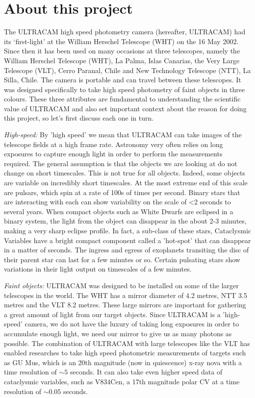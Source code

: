 \section{About this project} 

The ULTRACAM high speed photometry camera (hereafter, ULTRACAM) had its `first-light' at the William Herschel Telescope (WHT) on the 16 May 2002. Since then it has been used on many occasions at three telescopes, namely the William Herschel Telescope (WHT), La Palma, Islas Canarias, the Very Large Telescope (VLT), Cerro Paranal, Chile and New Technology Telescope (NTT), La Silla, Chile. The camera is portable and can travel between these telescopes. It was designed specifically to take high speed photometry of faint objects in three colours. These three attributes are fundamental to understanding the scientific value of ULTRACAM and also set important context about the reason for doing this project, so let's first discuss each one in turn. 

\emph{High-speed:} By 'high speed' we mean that ULTRACAM can take images of the telescope fields at a high frame rate. Astronomy very often relies on long exposures to capture enough light in order to perform the measurements required. The general assumption is that the objects we are looking at do not change on short timescales. This is not true for all objects. Indeed, some objects are variable on incredibly short timescales. At the most extreme end of this scale are pulsars, which spin at a rate of 100s of times per second. Binary stars that are interacting with each can show variability on the scale of \textless 2 seconds to several years. When compact objects such as White Dwarfs are eclipsed in a binary system, the light from the object can disappear in the about 2-3 minutes, making a very sharp eclipse profile. In fact, a sub-class of these stars, Cataclysmic Variables have a bright compact component called a 'hot-spot' that can disappear in a matter of seconds. The ingress and egress of exoplanets transiting the disc of their parent star can last for a few minutes or so. Certain pulsating stars show variations in their light output on timescales of a few minutes. 

\emph{Faint objects:} ULTRACAM was designed to be installed on some of the larger telescopes in the world. The WHT has a mirror diameter of 4.2 metres, NTT 3.5 metres and the VLT 8.2 metres. These large mirrors are important for gathering a great amount of light from our target objects. Since ULTRACAM is a 'high-speed' camera, we do not have the luxury of taking long exposures in order to accumulate enough light, we need our mirror to give us as many photons as possible. The combination of ULTRACAM with large telescopes like the VLT has enabled researches to take high speed photometric measurements of targets such as GU Mus, which is an 20th magnitude (now in quiescence) x-ray nova with a time resolution of $\sim 5$ seconds. It can also take even higher speed data of cataclysmic variables, such as V834Cen, a 17th magnitude polar CV at a time resolution of $\sim 0.05$ seconds.

